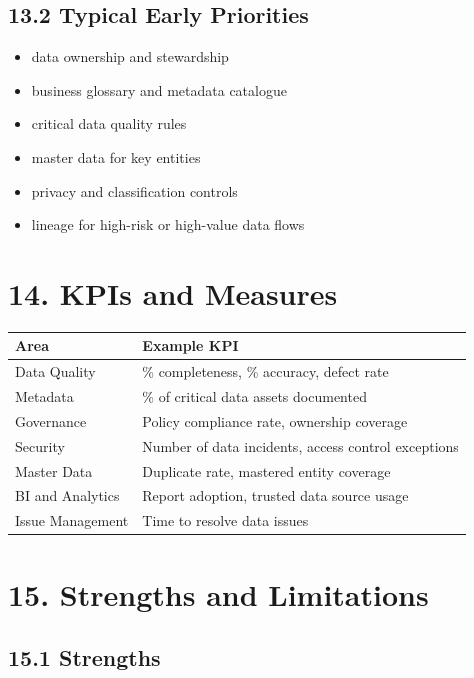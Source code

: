 \documentclass[
  letterpaper,
  DIV=11,
  numbers=noendperiod]{scrartcl}
\providecommand{\tightlist}{%
  \setlength{\itemsep}{0pt}\setlength{\parskip}{0pt}}
\begin{document}
\subsection{13.2 Typical Early
Priorities}\label{typical-early-priorities}

\begin{itemize}
\tightlist
\item
  data ownership and stewardship
\item
  business glossary and metadata catalogue
\item
  critical data quality rules
\item
  master data for key entities
\item
  privacy and classification controls
\item
  lineage for high-risk or high-value data flows
\end{itemize}

\section{14. KPIs and Measures}\label{kpis-and-measures}

\begin{longtable}[]{@{}ll@{}}
\toprule\noalign{}
Area & Example KPI \\
\midrule\noalign{}
\endhead
\bottomrule\noalign{}
\endlastfoot
Data Quality & \% completeness, \% accuracy, defect rate \\
Metadata & \% of critical data assets documented \\
Governance & Policy compliance rate, ownership coverage \\
Security & Number of data incidents, access control exceptions \\
Master Data & Duplicate rate, mastered entity coverage \\
BI and Analytics & Report adoption, trusted data source usage \\
Issue Management & Time to resolve data issues \\
\end{longtable}

\section{15. Strengths and Limitations}\label{strengths-and-limitations}

\subsection{15.1 Strengths}\label{strengths}
\end{document}
